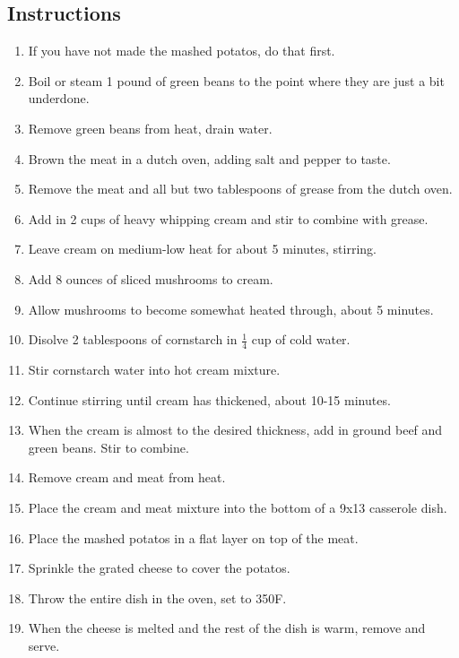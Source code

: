 \begin{multicols}{2}
\subsection*{Instructions}
\begin{enumerate}
    \item If you have not made the mashed potatos, do that first.
    \item Boil or steam 1 pound of green beans to the point where they are just a bit underdone.
    \item Remove green beans from heat, drain water.
    \item Brown the meat in a dutch oven, adding salt and pepper to taste.
    \item Remove the meat and all but two tablespoons of grease from the dutch oven.
    \item Add in 2 cups of heavy whipping cream and stir to combine with grease.
    \item Leave cream on medium-low heat for about 5 minutes, stirring.
    \item Add 8 ounces of sliced mushrooms to cream.
    \item Allow mushrooms to become somewhat heated through, about 5 minutes.
    \item Disolve 2 tablespoons of cornstarch in \( \frac{1}{4} \) cup of cold water.
    \item Stir cornstarch water into hot cream mixture.
    \item Continue stirring until cream has thickened, about 10-15 minutes.
    \item When the cream is almost to the desired thickness, add in ground beef and green beans. Stir to combine.
    \item Remove cream and meat from heat.
    \item Place the cream and meat mixture into the bottom of a 9x13 casserole dish.
    \item Place the mashed potatos in a flat layer on top of the meat.
    \item Sprinkle the grated cheese to cover the potatos.
    \item Throw the entire dish in the oven, set to 350F.
    \item When the cheese is melted and the rest of the dish is warm, remove and serve.
\end{enumerate}


\end{multicols}
